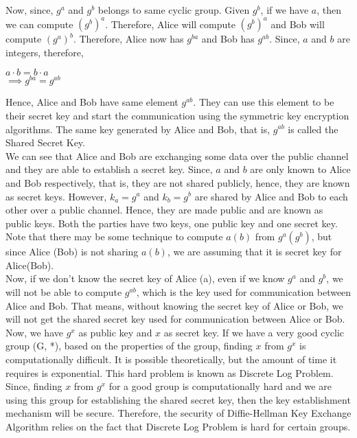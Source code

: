 \documentclass[11pt]{article}
\begin{document}
Now, since, $g^a$ and $g^b$ belongs to same cyclic group. Given $g^b$, if we have $a$, then we can compute ${(g^b)}^a$. Therefore, Alice will compute ${(g^b)}^a$ and Bob will compute ${(g^a)}^b$. Therefore, Alice now has $g^{ba}$ and Bob has $g^{ab}$. Since, $a$ and $b$ are integers, therefore,
\begin{center}
    $a\cdot b = b\cdot a$\\
    $\implies g^{ba} = g^{ab}$
\end{center}
Hence, Alice and Bob have same element $g^{ab}$. They can use this element to be their secret key and start the communication using the symmetric key encryption algorithms. The same key generated by Alice and Bob, that is, $g^{ab}$ is called the Shared Secret Key.\\
\newline
We can see that Alice and Bob are exchanging some data over the public channel and they are able to establish a secret key. Since, $a$ and $b$ are only known to Alice and Bob respectively, that is, they are not shared publicly, hence, they are known as secret keys. However, $k_a = g^a$ and $k_b = g^b$ are shared by Alice and Bob to each other over a public channel. Hence, they are made public and are known as public keys. Both the parties have two keys, one public key and one secret key. Note that there may be some technique to compute $a (b)$ from $g^a (g^b)$, but since Alice (Bob) is not sharing $a (b)$, we are assuming that it is secret key for Alice(Bob).\\
\newline
Now, if we don't know the secret key of Alice (a), even if we know $g^a$ and $g^b$, we will not be able to compute $g^{ab}$, which is the key used for communication between Alice and Bob. That means, without knowing the secret key of Alice or Bob, we will not get the shared secret key used for communication between Alice or Bob.\\
\newline
Now, we have $g^x$ as public key and $x$ as secret key. If we have a very good cyclic group (G, *), based on the properties of the group, finding $x$ from $g^x$ is computationally difficult. It is possible theoretically, but the amount of time it requires is exponential. This hard problem is known as Discrete Log Problem. Since, finding $x$ from $g^x$ for a good group is computationally hard and we are using this group for establishing the shared secret key, then the key establishment mechanism will be secure. Therefore, the security of Diffie-Hellman Key Exchange Algorithm relies on the fact that Discrete Log Problem is hard for certain groups.\\
\end{document}
